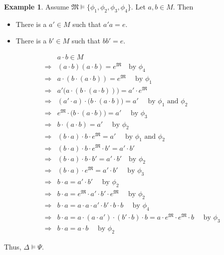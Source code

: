 \documentclass[11pt,letterpaper]{book}
\theoremstyle{definition}
\newtheorem{example}{Example}[section]
\begin{document}
\begin{example}
Assume $\mathfrak{M} \models \{ \phi_1, \phi_2, \phi_3, \phi_4 \}$. Let
$a, b \in M$. Then
\begin{itemize}
\item{There is a $a' \in M$ such that $a' a = e$.}
\item{There is a $b' \in M$ such that $b b' = e$.}
\end{itemize}
\begin{eqnarray*}
& & a\cdot b \in M  \\
& \Rightarrow & (a\cdot b) (a \cdot b) = e^{\mathfrak{M}} \quad \text{
by } \phi_4 \\
& \Rightarrow & a \cdot (b \cdot (a \cdot b)) = e^{\mathfrak{M}} \quad
\text{ by } \phi_1 \\
& \Rightarrow & a' \big( a \cdot (b \cdot (a \cdot b)) \big) = a' \cdot
e^{\mathfrak{M}} \\
& \Rightarrow & (a' \cdot a) \cdot \big( b \cdot (a \cdot b) \big) = a'
\quad \text{ by } \phi_1 \text{ and } \phi_2 \\
& \Rightarrow & e^{\mathfrak{M}} \cdot \big(b \cdot (a \cdot b) \big) =
a' \quad \text{ by } \phi_3 \\
& \Rightarrow & b \cdot (a \cdot b) = a' \quad \text{ by } \phi_2 \\
& \Rightarrow & (b \cdot a) \cdot b \cdot e^{\mathfrak{M}} = a' \quad
\text{ by } \phi_1 \text{ and } \phi_2 \\
& \Rightarrow & (b \cdot a) \cdot b \cdot e^{\mathfrak{M}} \cdot b' = a'
\cdot b' \\
& \Rightarrow & (b \cdot a) \cdot b \cdot b' = a' \cdot b' \quad \text{
by } \phi_2 \\
& \Rightarrow & (b \cdot a) \cdot e^{\mathfrak{M}}  = a' \cdot b' \quad
\text{ by } \phi_3 \\
& \Rightarrow & b \cdot a  = a' \cdot b' \quad \text{ by } \phi_2 \\
& \Rightarrow & b \cdot a  = e^{\mathfrak{M}} \cdot a' \cdot b' \cdot
e^{\mathfrak{M}} \quad \text{ by } \phi_2 \\
& \Rightarrow & b \cdot a  = a \cdot a \cdot a' \cdot b' \cdot b \cdot b
\quad \text{ by } \phi_4 \\
& \Rightarrow & b \cdot a  = a \cdot ( a \cdot a' ) \cdot ( b' \cdot b)
\cdot b = a \cdot e^{\mathfrak{M}} \cdot e^{\mathfrak{M}} \cdot b \quad
\text{ by } \phi_3 \\
& \Rightarrow & b \cdot a  =  a \cdot  b \quad \text{ by } \phi_2
\end{eqnarray*}

Thus, $\Delta \models \Psi$.
\end{example}
\end{document}
